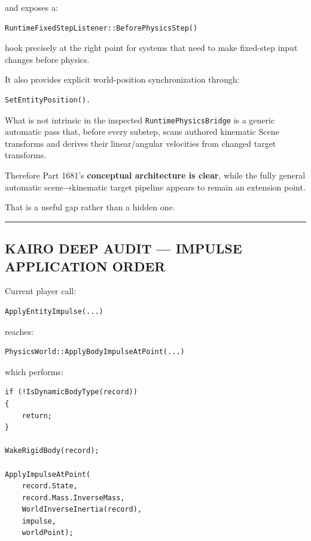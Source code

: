 and exposes a:

\begin{verbatim}
RuntimeFixedStepListener::BeforePhysicsStep()
\end{verbatim}

hook precisely at the right point for systems that need to make fixed-step input changes before physics.

It also provides explicit world-position synchronization through:

\begin{verbatim}
SetEntityPosition().
\end{verbatim}

What is not intrinsic in the inspected \texttt{RuntimePhysicsBridge} is a generic automatic pass that, before every substep, scans authored kinematic Scene transforms and derives their linear/angular velocities from changed target transforms.

Therefore Part 1681's \textbf{conceptual architecture is clear}, while the fully general automatic scene→kinematic target pipeline appears to remain an extension point.

That is a useful gap rather than a hidden one.

\begin{center}\rule{0.5\linewidth}{0.5pt}\end{center}

\subsection{KAIRO DEEP AUDIT --- IMPULSE APPLICATION ORDER}\label{06-engine-ii-ch037-kairo-deep-audit-impulse-application-order}

Current player call:

\begin{verbatim}
ApplyEntityImpulse(...)
\end{verbatim}

reaches:

\begin{verbatim}
PhysicsWorld::ApplyBodyImpulseAtPoint(...)
\end{verbatim}

which performs:

\begin{verbatim}
if (!IsDynamicBodyType(record))
{
    return;
}

WakeRigidBody(record);

ApplyImpulseAtPoint(
    record.State,
    record.Mass.InverseMass,
    WorldInverseInertia(record),
    impulse,
    worldPoint);
\end{verbatim}

